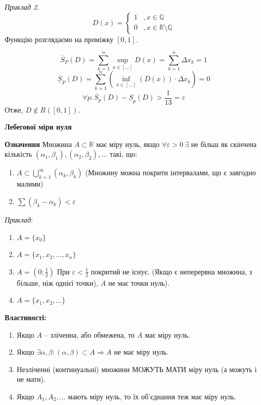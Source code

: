 \documentclass[12pt]{report}
\begin{document}
	\textit{Приклад 2.}
	$$D(x) =  \begin{cases} 1 &, x \in \mathbb{Q} \\
	0 &, x \in \mathbb{R} \setminus \mathbb{Q} \end{cases}$$
	Функцію розглядаємо на проміжку $[0,1]$.
	
	$$\overline S_{P} (D) = \sum_{k=1}^n \sup_{x \in [\ldots]} D(x) = \sum_{k=1}^n \Delta x_k = 1$$
	$$\underline S_{P} (D) = \sum_{k=1}^n( \inf_{x \in [\ldots]} (D(x)) \cdot  \Delta x_k) = 0$$
	$$\forall p : \overline S_{p}(D) - \underline S_{p} (D) > \frac{1}{13} =  \varepsilon$$
	Отже, $D \notin R([0,1])$.
	
	\begin{center}
		\textbf{ Лебегової міри нуля} 
	\end{center}
	
	\textbf{Означення} Множина $A \subset \mathbb{R}$ має міру нуль, якщо $\forall \varepsilon > 0 \ \exists$ не більш як скінчена кількість $ (\alpha_1,\beta_1), (\alpha_2,\beta_2), \ldots$ такі, що:
	
	\begin{enumerate}
		
		\item $A \subset \bigcup_{k=1}^{\infty} (\alpha_k, \beta_k)$ (Множину можна покрити інтервалами, що є завгодно малими)
		
		\item $\sum (\beta_k - \alpha_k) < \varepsilon$
		
	\end{enumerate}
	
	\textit{Приклад}:
	
	\begin{enumerate}
		
		\item $A = \{ x_0\}$
		\item $A = \{ x_1, x_2, \ldots, x_n\}$
		\item $A = (0; \frac{1}{2})$ При $\varepsilon < \frac{1}{2}$ покритий не існує. (Якщо є неперервна множина, з більше, ніж однієї точки), $A$ не має точки нуль).
		\item $A = \{ x_1, x_2, \ldots\}$
	\end{enumerate}
	
	\textbf{Властивості:}
	
	\begin{enumerate}
		
		\item Якщо $A$ -- зліченна, або обмежена, то $A$ має міру нуль.
		\item Якщо $\exists \alpha, \beta : (\alpha, \beta) \subset A \Longrightarrow A$ не має міру нуль.
		\item Незліченні (континуальні) множини МОЖУТЬ МАТИ  міру нуль (а можуть і не мати).
		\item Якщо $A_1, A_2, \ldots$ мають міру нуль, то їх об'єднання теж має міру нуль.  
		
	\end{enumerate}
	
\end{document}
